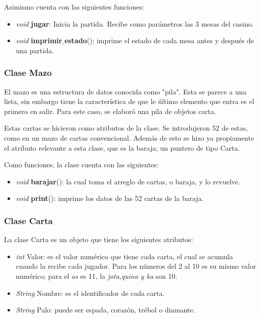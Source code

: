 \documentclass[11pt]{article}
\begin{document}
Asimismo cuenta con las siguientes funciones:
\begin{itemize}
\item \textit{void} \textbf{jugar}: Inicia la partida. Recibe como parámetros las 3 mesas del casino.
\item \textit{void} \textbf{imprimir$\_$estado}(); imprime el estado de cada mesa antes y después de una partida. 
\end{itemize}







\subsubsection{Clase Mazo}
El mazo es una estructura de datos conocida como "pila". Esta se parece a una lista, sin embargo tiene la característica de que le último elemento que entra es el primero en salir. Para este caso, se elaboró una pila de objetos carta.

Estas cartas se hicieron como atributos de la clase. Se introdujeron 52 de estas, como en un mazo de cartas convencional. Además de esto se hizo ya propiamente el atributo relevante a esta clase, que es la baraja; un puntero de tipo Carta.  

Como funciones, la clase cuenta con las siguientes:
\begin{itemize}
\item \textit{void} \textbf{barajar}(): la cual toma el arreglo de cartas, o baraja, y lo revuelve.
\item \textit{void} \textbf{print}(): imprime los datos de las 52 cartas de la baraja. 
\end{itemize}

\subsubsection{Clase Carta}
La clase Carta es un objeto que tiene los siguientes atributos:
\begin{itemize}
\item \textit{int} Valor: es el valor numérico que tiene cada carta, el cual se acumula cuando la recibe cada jugador. Para los números del 2 al 10 es su mismo valor numérico; para el \textit{as} es 11, la \textit{jota,quina y ka} son 10. 
\item \textit{String} Nombre: es el identificador de cada carta.
\item \textit{String} Palo: puede ser espada, corazón, trébol o diamante. 
\end{itemize}
\end{document}
